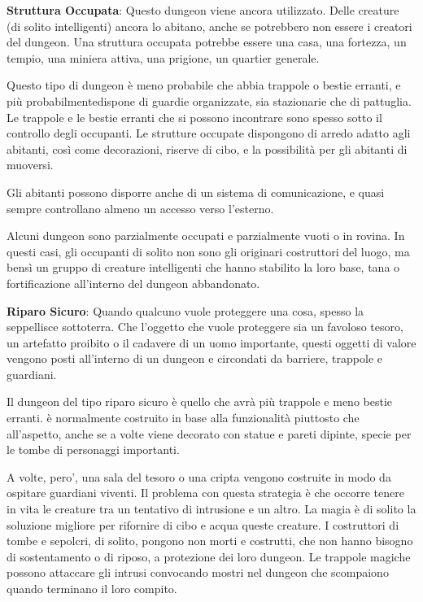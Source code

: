 \documentclass[a4paper,11pt,twoside,openany]{book}
\begin{document}
{\textbf{Struttura Occupata}: Questo dungeon viene ancora utilizzato. Delle creature (di solito intelligenti) ancora lo abitano, anche se potrebbero non essere i creatori del dungeon. Una struttura occupata potrebbe essere una casa, una fortezza, un tempio, una miniera attiva, una prigione, un quartier generale. 

Questo tipo di dungeon è meno probabile che abbia trappole o bestie erranti, e più probabilmentedispone di guardie organizzate, sia stazionarie che di pattuglia. Le trappole e le bestie erranti che si possono incontrare sono spesso sotto il controllo degli occupanti. Le strutture occupate dispongono di arredo adatto agli abitanti, così come decorazioni, riserve di cibo, e la possibilità per gli abitanti di muoversi.

Gli abitanti possono disporre anche di un sistema di comunicazione, e quasi sempre
controllano almeno un accesso verso l'esterno.

Alcuni dungeon sono parzialmente occupati e parzialmente vuoti o in rovina. In questi casi, gli occupanti di solito non sono gli originari costruttori del luogo, ma bensì un gruppo di creature intelligenti che hanno stabilito la loro base, tana o fortificazione all'interno del dungeon abbandonato.

\textbf{Riparo Sicuro}: Quando qualcuno vuole proteggere una cosa, spesso la seppellisce sottoterra. Che l'oggetto che vuole proteggere sia un favoloso tesoro, un artefatto proibito o il cadavere di un uomo importante, questi oggetti di valore vengono posti all'interno di un dungeon e circondati da barriere, trappole e guardiani.

Il dungeon del tipo riparo sicuro è quello che avrà più trappole e meno bestie erranti. è normalmente costruito in base alla funzionalità piuttosto che all'aspetto, anche se a volte viene decorato con statue e pareti dipinte, specie per le tombe di personaggi importanti.

A volte, pero', una sala del tesoro o una cripta vengono costruite in modo da ospitare guardiani viventi. Il problema con questa strategia è che occorre tenere in vita le creature tra un tentativo di intrusione e un altro. La magia è di solito la soluzione migliore per rifornire di cibo e acqua queste creature. I costruttori di tombe e sepolcri, di solito, pongono non morti e costrutti, che non hanno bisogno di sostentamento o di riposo, a protezione dei loro dungeon. Le trappole magiche possono attaccare gli intrusi convocando mostri nel dungeon che scompaiono quando terminano il loro compito.

}
\end{document}
